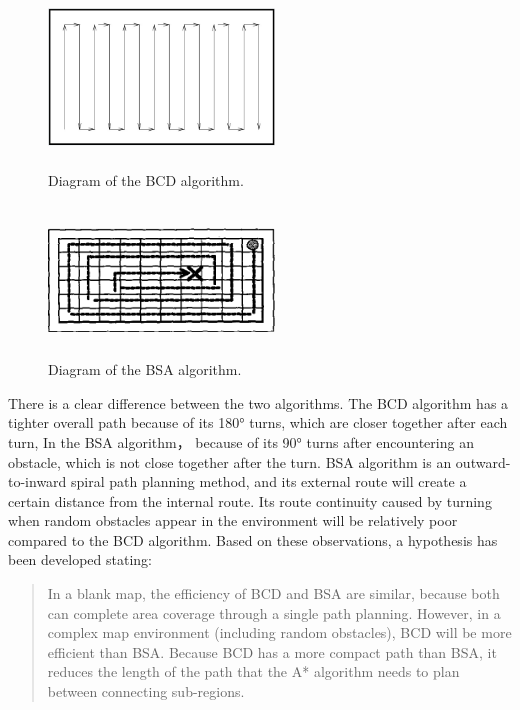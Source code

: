 \documentclass[conference]{IEEEtran}
\begin{document}
\begin{figure}[htbp]
\centering
\begin{minipage}[t]{0.48\textwidth}
\centering
\includegraphics[width=6cm,height=4cm]{RS_Report/bcd.png}
\caption{Diagram of the BCD algorithm\cite{choset1998coverage}. }
\label{bcd}
\end{minipage}
\begin{minipage}[t]{0.48\textwidth}
\centering
\includegraphics[width=6cm,height=4cm]{RS_Report/BSA.png}
\caption{Diagram of the BSA algorithm\cite{Gonzlez2003BSAAC}.}
\label{bsa}
\end{minipage}
\end{figure}

There is a clear difference between the two algorithms. The BCD algorithm has a tighter overall path because of its 180° turns, which are closer together after each turn, In the BSA algorithm， because of its 90° turns after encountering an obstacle, which is not close together after the turn. BSA algorithm is an outward-to-inward spiral path planning method, and its external route will create a certain distance from the internal route. Its route continuity caused by turning when random obstacles appear in the environment will be relatively poor compared to the BCD algorithm.
Based on these observations, a hypothesis has been developed stating:
\begin{quote}
    In a blank map, the efficiency of BCD and BSA are similar, because both can complete area coverage through a single path planning. However, in a complex map environment (including random obstacles), BCD will be more efficient than BSA. Because BCD has a more compact path than BSA, it reduces the length of the path that the A* algorithm needs to plan between connecting sub-regions.
\end{quote}
\end{document}
